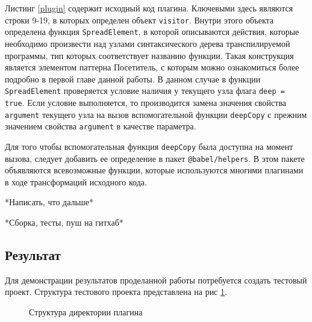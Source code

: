 \documentclass[14pt, a4paper]{article}
\def\code#1{\texttt{#1}} %
\begin{document}
Листинг \ref{plugin} содержит исходный код плагина. Ключевыми здесь являются строки 9-19, в которых определен 
объект \code{visitor}. Внутри этого объекта определена функция \code{SpreadElement}, в которой описываются
действия, которые необходимо произвести над узлами синтаксического дерева транспилируемой программы, 
тип которых соответствует названию функции. Такая конструкция является элементом паттерна Посетитель, с которым 
можно ознакомиться более подробно в первой главе данной работы. В данном случае в функции \code{SpreadElement}
проверяется условие наличия у текущего узла флага \code{deep = true}. Если условие выполняется, то 
производится замена значения свойства \code{argument} текущего узла на вызов вспомогательной функции \code{deepCopy} 
с прежним значением свойства \code{argument} в качестве параметра. 



Для того чтобы вспомогательная функция \code{deepCopy} была доступна на момент вызова, следует добавить ее определение в 
пакет \code{@babel/helpers}. В этом пакете объявляются всевозможные функции, которые используются многими 
плагинами в ходе трансформаций исходного кода. 




*Написать, что дальше*

*Сборка, тесты, пуш на гитхаб*

\subsection{Результат}

Для демонстрации результатов проделанной работы потребуется создать тестовый проект. Структура тестового проекта 
представлена на рис \ref{test_struct}.
\begin{figure}[h!]
  \centering
  \caption{Структура директории плагина}
  \label{test_struct}
\end{figure}
\end{document}
